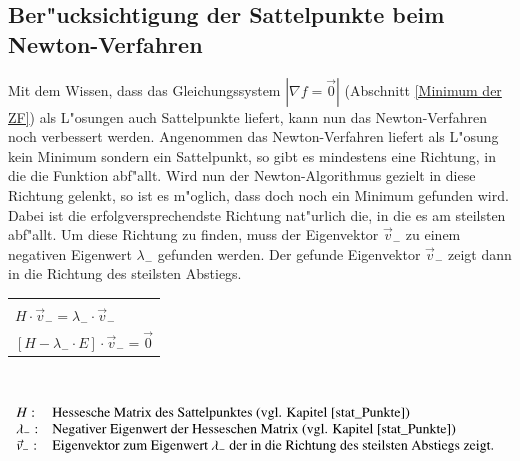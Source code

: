 	\subsection{Ber"ucksichtigung der Sattelpunkte beim Newton-Verfahren}
		Mit dem Wissen, dass das Gleichungssystem $|\nabla f = \vec 0 |$ (Abschnitt \ref{Minimum der ZF}) als L"osungen auch Sattelpunkte liefert, kann nun das Newton-Verfahren noch verbessert werden. Angenommen das Newton-Verfahren liefert als L"osung kein Minimum sondern ein Sattelpunkt, so gibt es mindestens eine Richtung, in die die Funktion abf"allt. Wird nun der Newton-Algorithmus gezielt in diese Richtung gelenkt, so ist es m"oglich, dass doch noch ein Minimum gefunden wird. Dabei ist die erfolgversprechendste Richtung nat"urlich die, in die es am steilsten abf"allt. Um diese Richtung zu finden, muss der Eigenvektor $\vec v_-$ zu einem negativen Eigenwert $\lambda_-$ gefunden werden. Der gefunde Eigenvektor $\vec v_-$ zeigt dann in die Richtung des steilsten Abstiegs. \\[0.25cm]
		\begin{minipage}{\textwidth}
			\begin{tabular}{|l|}
				\hline
				\\[-0.2cm]
				$ H\cdot \vec v_- = \lambda_- \cdot \vec v_-$\\[0.2cm]
				$\left[H-\lambda_-\cdot E\right] \cdot \vec v_- = \vec 0$\\[0.2cm]
				\hline
			\end{tabular}
		\end{minipage}\\[0.25cm]
		\begin{minipage}{\textwidth}
			$\begin{array}{ll} H: & \text{Hessesche Matrix des Sattelpunktes (vgl. Kapitel \ref{stat_Punkte})}\\ \lambda_-: & \text{Negativer Eigenwert der Hesseschen Matrix (vgl. Kapitel \ref{stat_Punkte})}\\ \vec v_-:& \text{Eigenvektor zum Eigenwert }\lambda_- \text{ der in die Richtung des steilsten Abstiegs zeigt.}\end{array}$
		\end{minipage}

